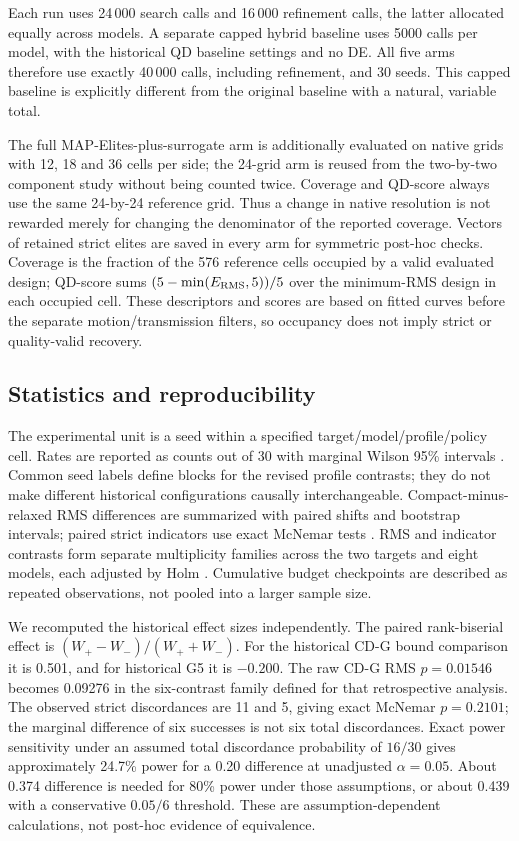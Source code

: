 \documentclass[applsci,article,submit,pdftex,moreauthors]{Definitions/mdpi}
\begin{document}
Each run uses 24\,000 search calls and 16\,000 refinement calls, the latter allocated equally across models. A separate capped hybrid baseline uses 5000 calls per model, with the historical QD baseline settings and no DE. All five arms therefore use exactly 40\,000 calls, including refinement, and 30 seeds. This capped baseline is explicitly different from the original baseline with a natural, variable total.

The full MAP-Elites-plus-surrogate arm is additionally evaluated on native grids with 12, 18 and 36 cells per side; the 24-grid arm is reused from the two-by-two component study without being counted twice. Coverage and QD-score always use the same 24-by-24 reference grid. Thus a change in native resolution is not rewarded merely for changing the denominator of the reported coverage. Vectors of retained strict elites are saved in every arm for symmetric post-hoc checks.
Coverage is the fraction of the 576 reference cells occupied by a valid evaluated design; QD-score sums $(5-\min(E_{\rm RMS},5))/5$ over the minimum-RMS design in each occupied cell. These descriptors and scores are based on fitted curves before the separate motion/transmission filters, so occupancy does not imply strict or quality-valid recovery.

\subsection{Statistics and reproducibility}\label{sec:statistics}
The experimental unit is a seed within a specified target/model/profile/policy cell. Rates are reported as counts out of 30 with marginal Wilson 95\% intervals \cite{Wilson1927}. Common seed labels define blocks for the revised profile contrasts; they do not make different historical configurations causally interchangeable. Compact-minus-relaxed RMS differences are summarized with paired shifts and bootstrap intervals; paired strict indicators use exact McNemar tests \cite{McNemar1947}. RMS and indicator contrasts form separate multiplicity families across the two targets and eight models, each adjusted by Holm \cite{Holm1979}. Cumulative budget checkpoints are described as repeated observations, not pooled into a larger sample size.

We recomputed the historical effect sizes independently. The paired rank-biserial effect is $(W_+-W_-)/(W_++W_-)$. For the historical CD-G bound comparison it is 0.501, and for historical G5 it is $-0.200$. The raw CD-G RMS $p=0.01546$ becomes 0.09276 in the six-contrast family defined for that retrospective analysis. The observed strict discordances are 11 and 5, giving exact McNemar $p=0.2101$; the marginal difference of six successes is not six total discordances. Exact power sensitivity under an assumed total discordance probability of $16/30$ gives approximately 24.7\% power for a 0.20 difference at unadjusted $\alpha=0.05$. About 0.374 difference is needed for 80\% power under those assumptions, or about 0.439 with a conservative $0.05/6$ threshold. These are assumption-dependent calculations, not post-hoc evidence of equivalence.
\end{document}
